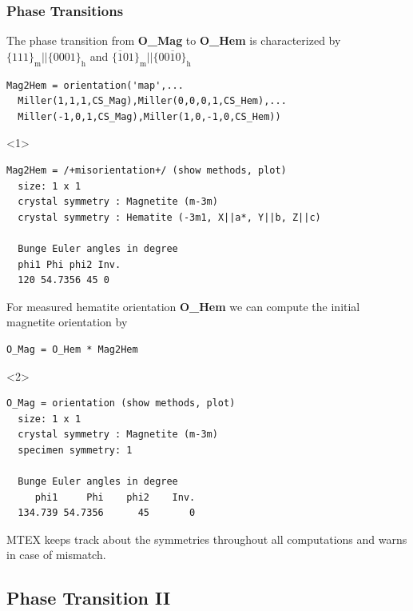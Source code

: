 \documentclass[compress]{beamer}
\begin{document}
\begin{frame}[fragile]
  \frametitle{Phase Transitions}

  \begin{overlayarea}{\textwidth}{8cm}
    The phase transition from {\bf O\_Mag} to {\bf O\_Hem} is characterized by
    $\{111\}_{\text{m}} || \{0001\}_{\text{h}}$ and
    $\{\overline{1}01\}_{\text{m}} || \{00\overline{1}0\}_{\text{h}}$
  \begin{lstlisting}[style=input]
Mag2Hem = orientation('map',...
  Miller(1,1,1,CS_Mag),Miller(0,0,0,1,CS_Hem),...
  Miller(-1,0,1,CS_Mag),Miller(1,0,-1,0,CS_Hem))
  \end{lstlisting}
  \begin{onlyenv}<1>
    \vspace{-0.3cm}
    \begin{lstlisting}[style=output]
Mag2Hem = /+misorientation+/ (show methods, plot)
  size: 1 x 1
  crystal symmetry : Magnetite (m-3m)
  crystal symmetry : Hematite (-3m1, X||a*, Y||b, Z||c)

  Bunge Euler angles in degree
  phi1 Phi phi2 Inv.
  120 54.7356 45 0
    \end{lstlisting}
  \end{onlyenv}

  \pause

  For measured hematite orientation {\bf O\_Hem}
  we can compute the initial magnetite orientation by
  \begin{lstlisting}[style=input]
O_Mag = O_Hem * Mag2Hem
  \end{lstlisting}
  \begin{onlyenv}<2>
    \vspace{-0.3cm}
    \begin{lstlisting}[style=output]
O_Mag = orientation (show methods, plot)
  size: 1 x 1
  crystal symmetry : Magnetite (m-3m)
  specimen symmetry: 1

  Bunge Euler angles in degree
     phi1     Phi    phi2    Inv.
  134.739 54.7356      45       0
    \end{lstlisting}
  \end{onlyenv}

  \pause

  \alert{MTEX keeps track about the symmetries throughout all computations and
  warns in case of mismatch.}

\end{overlayarea}
\end{frame}


\subsection*{Phase Transition II}
\end{document}
